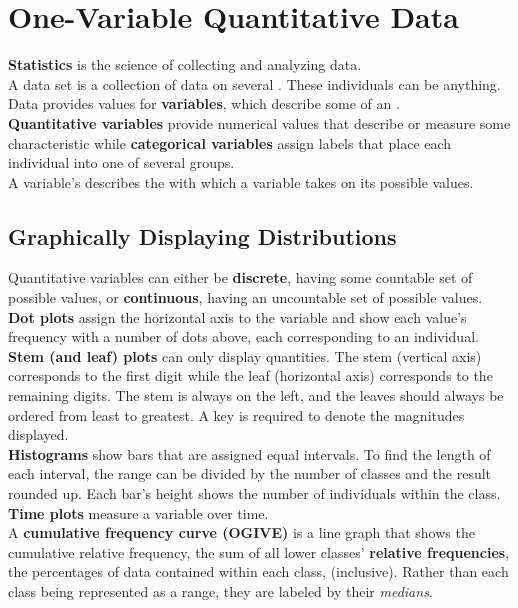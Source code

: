 \documentclass[../AP_Statistics.tex]{subfiles}
\begin{document}
	\chapter{One-Variable Quantitative Data}
		\textbf{Statistics} is the science of collecting and analyzing data. \\
		A data set is a collection of data on several . These individuals can be anything. \\
		Data provides values for \textbf{variables}, which describe some  of an . \\
		\textbf{Quantitative variables} provide numerical values that describe or measure some characteristic while \textbf{categorical variables} assign labels that place each individual into one of several groups. \\
		A variable's  describes the  with which a variable takes on its possible values.
		\section{Graphically Displaying Distributions}
			Quantitative variables can either be \textbf{discrete}, having some countable set of possible values, or \textbf{continuous}, having an uncountable set of possible values.
			\textbf{Dot plots} assign the horizontal axis to the variable and show each value's frequency with a number of dots above, each corresponding to an individual. \\
			\textbf{Stem (and leaf) plots} can only display quantities. The stem (vertical axis) corresponds to the first digit while the leaf (horizontal axis) corresponds to the remaining digits. The stem is always on the left, and the leaves should always be ordered from least to greatest. A key is required to denote the magnitudes displayed. \\
			\textbf{Histograms} show bars that are assigned equal intervals. To find the length of each interval, the range can be divided by the number of classes and the result rounded up. Each bar's height shows the number of individuals within the class. \\
			\textbf{Time plots} measure a variable over time. \\
			A \textbf{cumulative frequency curve (OGIVE)} is a line graph that shows the cumulative relative frequency, the sum of all lower classes' \textbf{relative frequencies}, the percentages of data contained within each class, (inclusive). Rather than each class being represented as a range, they are labeled by their \emph{medians}.
\end{document}
